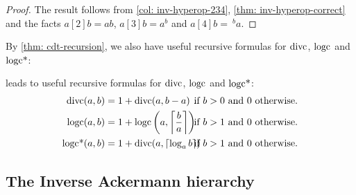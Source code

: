 \begin{proof}
	The result follows from \cref{col: inv-hyperop-234}, \cref{thm: inv-hyperop-correct} and the facts $a[2]b = ab$, $a[3]b = a^b$ and {\color{magenta}$a[4]b = \ ^ba$}.
\end{proof}
\begin{rem}
	{\color{magenta}By \ref{thm: cdt-recursion}, we also have useful recursive formulas for $\text{divc}$, $\text{logc}$ and $\text{logc*}$:}
	
	{\color{blue}  leads to useful recursive formulas for $\text{divc}$, $\text{logc}$ and $\text{logc*}$:}
	\begin{align*}
	\divc(a, b) & = 1 + \divc(a, b - a) &\hspace{-20pt} \text{ if } b > 0 &\text{ and } 0 \text{ otherwise}. \\
	\logc(a, b) & = 1 + \logc\left(a, \left\lceil \frac{b}{a} \right\rceil\right) &\hspace{-20pt} \text{ if } b > 1 &\text{ and } 0 \text{ otherwise}. \\
	\logstarc(a, b) & = 1 + \divc(a, \left\lceil \log_ab \right\rceil) &\hspace{-20pt} \text{ if } b > 1 &\text{ and } 0 \text{ otherwise}.
	\end{align*}
\end{rem}

\subsection{The Inverse Ackermann hierarchy}

